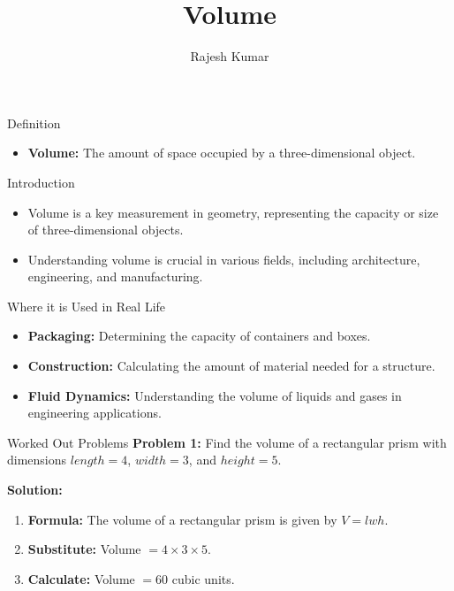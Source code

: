 \title{Volume}
\author{Rajesh Kumar}
\date{}

\begin{frame}
  \titlepage
\end{frame}

\begin{frame}{Definition}
  \begin{itemize}
    \item \textbf{Volume:} The amount of space occupied by a three-dimensional object.
  \end{itemize}
\end{frame}

\begin{frame}{Introduction}
  \begin{itemize}
    \item Volume is a key measurement in geometry, representing the capacity or size of three-dimensional objects.
    \item Understanding volume is crucial in various fields, including architecture, engineering, and manufacturing.
  \end{itemize}
\end{frame}

\begin{frame}{Where it is Used in Real Life}
  \begin{itemize}
    \item \textbf{Packaging:} Determining the capacity of containers and boxes.
    \item \textbf{Construction:} Calculating the amount of material needed for a structure.
    \item \textbf{Fluid Dynamics:} Understanding the volume of liquids and gases in engineering applications.
  \end{itemize}
\end{frame}

\begin{frame}{Worked Out Problems}
  \textbf{Problem 1:} Find the volume of a rectangular prism with dimensions $length = 4$, $width = 3$, and $height = 5$.

  \textbf{Solution:}
  \begin{enumerate}
    \item \textbf{Formula:} The volume of a rectangular prism is given by $V = lwh$.
    \item \textbf{Substitute:} Volume $= 4 \times 3 \times 5$.
    \item \textbf{Calculate:} Volume $= 60$ cubic units.
  \end{enumerate}
\end{frame}


